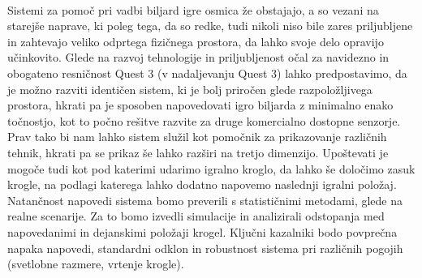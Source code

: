 \documentclass[a4paper, 12pt]{article}
\newcommand\cmnt[1]{\textcolor{munsell}{#1}}
\begin{document}
\\Sistemi za pomoč pri vadbi biljard igre osmica že obstajajo, a so vezani na starejše naprave, ki poleg tega, da so redke, tudi nikoli niso bile zares priljubljene \cite{Sousa2016} in zahtevajo veliko odprtega fizičnega prostora, da lahko svoje delo opravijo učinkovito. Glede na razvoj tehnologije in priljubljenost očal za navidezno in obogateno resničnost Quest 3 (v nadaljevanju Quest 3) lahko predpostavimo, da je možno razviti identičen sistem, ki je bolj priročen glede razpoložljivega prostora, hkrati pa je sposoben napovedovati igro biljarda z minimalno enako točnostjo, kot to počno rešitve razvite za druge komercialno dostopne senzorje. Prav tako bi nam lahko sistem služil kot pomočnik za prikazovanje različnih tehnik, hkrati pa se prikaz še lahko razširi na tretjo dimenzijo. Upoštevati je mogoče tudi kot pod katerimi udarimo igralno kroglo, da lahko še določimo zasuk krogle, na podlagi katerega lahko dodatno napovemo naslednji igralni položaj. 
Natančnost napovedi sistema bomo preverili s statističnimi metodami, glede na realne scenarije. Za to bomo izvedli simulacije in analizirali odstopanja med napovedanimi in dejanskimi položaji krogel. Ključni kazalniki bodo povprečna napaka napovedi, standardni odklon in robustnost sistema pri različnih pogojih (svetlobne razmere, vrtenje krogle).

\end{document}
